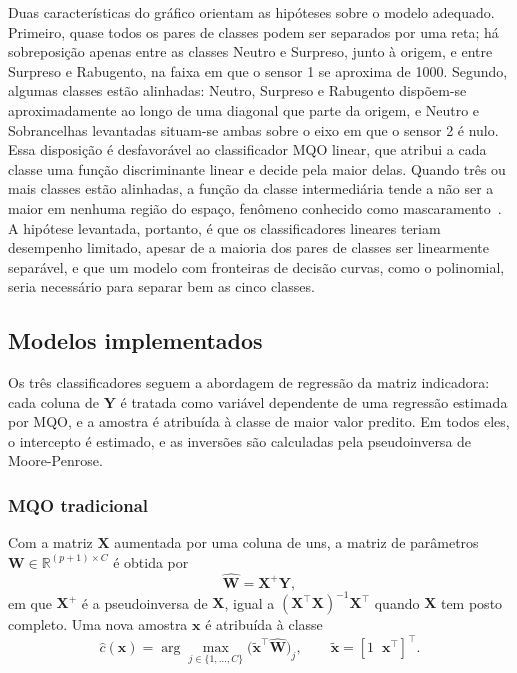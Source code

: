 \documentclass[conference]{IEEEtran}
\begin{document}
Duas características do gráfico orientam as hipóteses sobre o modelo adequado.
Primeiro, quase todos os pares de classes podem ser separados por uma reta; há
sobreposição apenas entre as classes Neutro e Surpreso, junto à origem, e entre
Surpreso e Rabugento, na faixa em que o sensor 1 se aproxima de 1000. Segundo,
algumas classes estão alinhadas: Neutro, Surpreso e Rabugento dispõem-se
aproximadamente ao longo de uma diagonal que parte da origem, e Neutro e
Sobrancelhas levantadas situam-se ambas sobre o eixo em que o sensor 2 é nulo.
Essa disposição é desfavorável ao classificador MQO linear, que atribui a cada
classe uma função discriminante linear e decide pela maior delas. Quando três
ou mais classes estão alinhadas, a função da classe intermediária tende a não
ser a maior em nenhuma região do espaço, fenômeno conhecido como
mascaramento~\cite{b4}. A hipótese levantada, portanto, é que os
classificadores lineares teriam desempenho limitado, apesar de a maioria dos
pares de classes ser linearmente separável, e que um modelo com fronteiras de
decisão curvas, como o polinomial, seria necessário para separar bem as cinco
classes.

\subsection{Modelos implementados}

Os três classificadores seguem a abordagem de regressão da matriz indicadora:
cada coluna de $\mathbf{Y}$ é tratada como variável dependente de uma regressão
estimada por MQO, e a amostra é atribuída à classe de maior valor predito. Em
todos eles, o intercepto é estimado, e as inversões são calculadas pela
pseudoinversa de Moore-Penrose.

\subsubsection{MQO tradicional}

Com a matriz $\mathbf{X}$ aumentada por uma coluna de uns, a matriz de
parâmetros $\mathbf{W} \in \mathbb{R}^{(p+1) \times C}$ é obtida por
\begin{equation}
\hat{\mathbf{W}} = \mathbf{X}^{+}\mathbf{Y},
\label{eq:ols-cls}
\end{equation}
em que $\mathbf{X}^{+}$ é a pseudoinversa de $\mathbf{X}$, igual a
$(\mathbf{X}^{\top}\mathbf{X})^{-1}\mathbf{X}^{\top}$ quando $\mathbf{X}$ tem
posto completo. Uma nova amostra $\mathbf{x}$ é atribuída à classe
\begin{equation}
\hat{c}(\mathbf{x}) = \arg\max_{j \in \{1,\ldots,C\}} \big(\tilde{\mathbf{x}}^{\top}\hat{\mathbf{W}}\big)_j, \qquad \tilde{\mathbf{x}} = [1 \;\; \mathbf{x}^{\top}]^{\top}.
\label{eq:argmax}
\end{equation}
\end{document}
